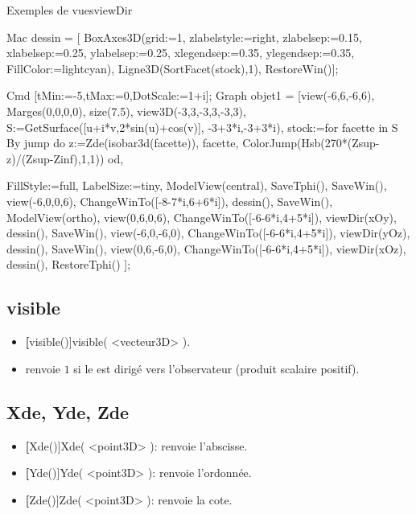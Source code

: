 \begin{demo}{Exemples de vues}{viewDir}
\begin{texgraph}[name=viewDir,file]
Mac
  dessin = [ BoxAxes3D(grid:=1, zlabelstyle:=right,
     zlabelsep:=0.15, xlabelsep:=0.25,
       ylabelsep:=0.25,
     xlegendsep:=0.35, ylegendsep:=0.35,
     FillColor:=lightcyan),
   Ligne3D(SortFacet(stock),1), RestoreWin()];

Cmd [tMin:=-5,tMax:=0,DotScale:=1+i];
Graph objet1 = [view(-6,6,-6,6), Marges(0,0,0,0),
     size(7.5),
   view3D(-3,3,-3,3,-3,3),
   S:=GetSurface([u+i*v,2*sin(u)+cos(v)],
          -3+3*i,-3+3*i),
   stock:=for facette in S By jump do
      z:=Zde(isobar3d(facette)),
      facette,
      ColorJump(Hsb(270*(Zsup-z)/(Zsup-Zinf),1,1))
     od,
  
   FillStyle:=full, LabelSize:=tiny,
   ModelView(central), SaveTphi(), SaveWin(),
   view(-6,0,0,6), ChangeWinTo([-8-7*i,6+6*i]),
   dessin(), SaveWin(), ModelView(ortho),
   view(0,6,0,6), ChangeWinTo([-6-6*i,4+5*i]),
   viewDir(xOy), dessin(), SaveWin(),
   view(-6,0,-6,0), ChangeWinTo([-6-6*i,4+5*i]),
   viewDir(yOz), dessin(), SaveWin(),
   view(0,6,-6,0), ChangeWinTo([-6-6*i,4+5*i]),
   viewDir(xOz), dessin(), RestoreTphi() ];
\end{texgraph}
\end{demo}

\subsection{visible}
\begin{itemize}
 \item \util \textbf[visible()]{visible( <vecteur3D> )}.
 \item \desc renvoie $1$ si le  est dirigé vers l'observateur (produit scalaire positif).
\end{itemize}


\subsection{Xde, Yde, Zde} 
\begin{itemize}
 \item \textbf[Xde()]{Xde( <point3D> )}: renvoie l'abscisse.
 \item \textbf[Yde()]{Yde( <point3D> )}: renvoie l'ordonnée.
 \item \textbf[Zde()]{Zde( <point3D> )}: renvoie la cote.
\end{itemize}

